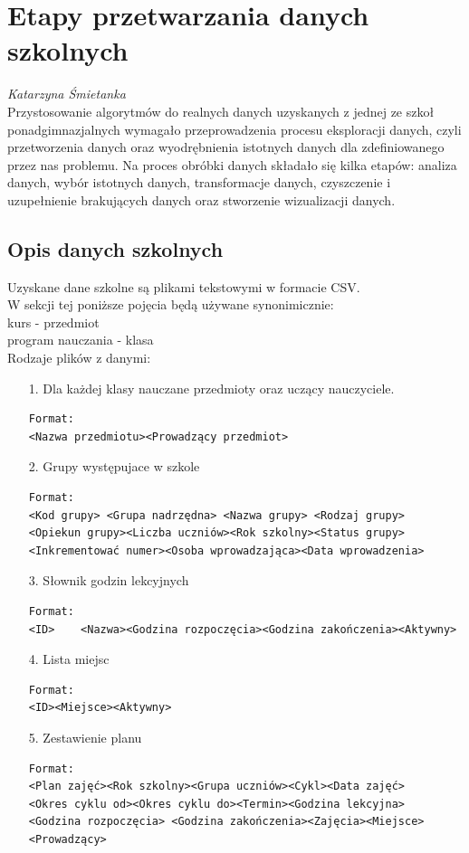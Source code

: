 
\chapter{Etapy przetwarzania danych szkolnych}
\textit{Katarzyna Śmietanka} \\
Przystosowanie algorytmów do realnych danych uzyskanych z jednej ze szkoł ponadgimnazjalnych wymagało przeprowadzenia procesu eksploracji danych, czyli przetworzenia danych oraz wyodrębnienia istotnych danych dla zdefiniowanego przez nas problemu. Na proces obróbki danych składało się kilka etapów: analiza danych, wybór istotnych danych, transformacje danych, czyszczenie i uzupełnienie brakujących danych oraz stworzenie wizualizacji danych.
\section{Opis danych szkolnych}
Uzyskane dane szkolne są plikami tekstowymi w formacie CSV. \\
W sekcji tej poniższe pojęcia będą używane synonimicznie: \\
kurs - przedmiot \\
program nauczania - klasa \\
Rodzaje plików z danymi:
\begin{enumerate}
\item[1.] Dla każdej klasy nauczane przedmioty oraz uczący nauczyciele.
\begin{verbatim}
Format:
<Nazwa przedmiotu><Prowadzący przedmiot>
\end{verbatim}
\item[2.] Grupy występujace w szkole
\begin{verbatim}
Format:
<Kod grupy> <Grupa nadrzędna> <Nazwa grupy> <Rodzaj grupy> 
<Opiekun grupy><Liczba uczniów><Rok szkolny><Status grupy>
<Inkrementować numer><Osoba wprowadzająca><Data wprowadzenia>
\end{verbatim}
\item[3.] Słownik godzin lekcyjnych
\begin{verbatim}
Format:
<ID>	<Nazwa><Godzina rozpoczęcia><Godzina zakończenia><Aktywny>
\end{verbatim}
\item[4.] Lista miejsc
\begin{verbatim}
Format:
<ID><Miejsce><Aktywny>
\end{verbatim}
\item[5.] Zestawienie planu
\begin{verbatim}
Format:
<Plan zajęć><Rok szkolny><Grupa uczniów><Cykl><Data zajęć>
<Okres cyklu od><Okres cyklu do><Termin><Godzina lekcyjna>
<Godzina rozpoczęcia> <Godzina zakończenia><Zajęcia><Miejsce><Prowadzący>
\end{verbatim}
\end{enumerate}

